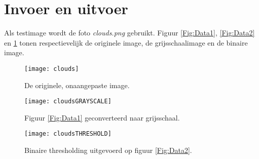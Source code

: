 \documentclass{article}
\begin{document}
	\section{Invoer en uitvoer}
	Als testimage wordt de foto \textit{clouds.png} gebruikt. Figuur \ref{Fig:Data1}, \ref{Fig:Data2} en \ref{Fig:Data3} tonen respectievelijk de originele image, de grijsschaalimage en de binaire image.
	\begin{figure}[!htb]
		\begin{minipage}{0.3\textwidth}
			\centering
			\texttt{[image: clouds]}
			\caption{De originele, onaangepaste image.}\label{Fig:Data1}
		\end{minipage}\hfill
		\begin{minipage}{0.3\textwidth}
			\centering
			\texttt{[image: cloudsGRAYSCALE]}
			\caption{Figuur \ref{Fig:Data1} geconverteerd naar grijsschaal.}\label{Fig:Data2}
		\end{minipage}\hfill
		\begin{minipage}{0.3\textwidth}
			\centering
			\texttt{[image: cloudsTHRESHOLD]}
			\caption{Binaire thresholding uitgevoerd op figuur \ref{Fig:Data2}.}\label{Fig:Data3}
		\end{minipage}
	\end{figure}
\end{document}

